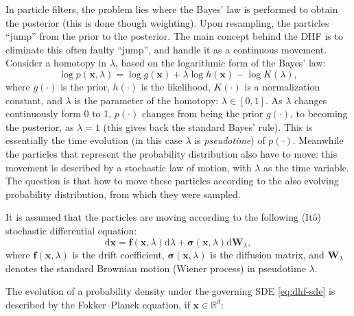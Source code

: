 In particle filters, the problem lies where the Bayes' law is performed to obtain the posterior (this is done though weighting). Upon resampling, the particles ``jump'' from the prior to the posterior. The main concept behind the DHF is to eliminate this often faulty ``jump'', and handle it as a continuous movement. Consider a homotopy in $\lambda$, based on the logarithmic form of the Bayes' law:
\begin{equation}\label{eq:bayes-loghom}
  \log p(\mathbf{x},\lambda) = \log g(\mathbf{x}) + \lambda \log h(\mathbf{x}) - \log K(\lambda),
\end{equation}
where $g(\cdot)$ is the prior, $h(\cdot)$ is the likelihood, $K(\cdot)$ is a normalization constant, and $\lambda$ is the parameter of the homotopy: $\lambda \in [0,1]$. As $\lambda$ changes continuously form 0 to 1, $p(\cdot)$ changes from being the prior $g(\cdot)$, to becoming the posterior, as $\lambda = 1$ (this gives back the standard Bayes' rule). This is essentially the time evolution (in this case $\lambda$ is \emph{pseudotime}) of $p(\cdot)$. Meanwhile the particles that represent the probability distribution also have to move: this movement is described by a stochastic law of motion, with $\lambda$ as the time variable. The question is that how to move these particles according to the also evolving probability distribution, from which they were sampled.

It is assumed that the particles are moving according to the following (It\^{o}) stochastic  differential equation:
\begin{equation}\label{eq:dhf-sde}
  \mathrm{d} \mathbf{x}=\mathbf{f}(\mathbf{x}, \lambda) \mathrm{d} \lambda+\boldsymbol{\sigma}(\mathbf{x}, \lambda) \mathrm{d} \mathbf{W}_{\lambda},
\end{equation}
where $\mathbf{f}(\mathbf{x},\lambda)$ is the drift coefficient,
$\boldsymbol\sigma(\mathbf{x},\lambda)$ is the diffusion matrix,
and $\mathbf{W}_\lambda$ denotes the standard Brownian motion (Wiener process) in
pseudotime $\lambda$.

The evolution of a probability density under the governing SDE \eqref{eq:dhf-sde} is described by the Fokker--Planck equation, if $\mathbf{x} \in \mathbb{R}^d$:

